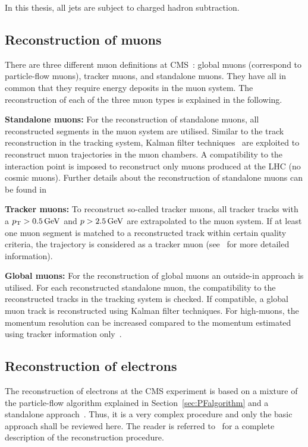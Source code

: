 In this thesis, all jets are subject to charged hadron subtraction.



\subsection{Reconstruction of muons}
There are three different muon definitions at CMS~\cite{bib:CMS:muon_recoEff}: global muons (correspond to particle-flow muons), tracker muons, and standalone muons.
They have all in common that they require energy deposits in the muon system.
The reconstruction of each of the three muon types is explained in the following.
\begin{description}
\item \textbf{Standalone muons:} For the reconstruction of standalone muons, all reconstructed segments in the muon system are utilised. Similar to the track reconstruction in the tracking system, Kalman filter techniques~\cite{bib:KalmanFilter_1987} are exploited to reconstruct muon trajectories in the muon chambers.
A compatibility to the interaction point is imposed to reconstruct only muons produced at the LHC (no cosmic muons).
Further details about the reconstruction of standalone muons can be found in~\cite{bib:StandaloneMuonReconstruction,bib:CMS:TDR_2006} 
\item \textbf{Tracker muons:} To reconstruct so-called tracker muons, all tracker tracks with a $p_{\text{T}}>0.5\,\text{Ge}\kern-0.06667em\text{V}$ and $p>2.5\,\text{Ge}\kern-0.06667em\text{V}$ are extrapolated to the muon system. If at least one muon segment is matched to a reconstructed track within certain quality criteria, the trajectory is considered as a tracker muon (see~\cite{bib:CMS:muon_recoEff} for more detailed information).
\item \textbf{Global muons:} For the reconstruction of global muons an outside-in approach is utilised. For each reconstructed standalone muon, the compatibility to the reconstructed tracks in the tracking system is checked. If compatible, a global muon track is reconstructed using Kalman filter techniques. For high-\pt muons, the momentum resolution can be increased compared to the momentum estimated using tracker information only~\cite{bib:CMS:muon_recoEff}.
\end{description}

\subsection{Reconstruction of electrons}
The reconstruction of electrons at the CMS experiment is based on a mixture of the particle-flow algorithm explained in Section~\ref{sec:PFalgorithm} and a standalone approach~\cite{bib:StandaloneElectronReconstruction}.
Thus, it is a very complex procedure and only the basic approach shall be reviewed here.
The reader is referred to~\cite{bib:CMS:elec_recoEff} for a complete description of the reconstruction procedure.

